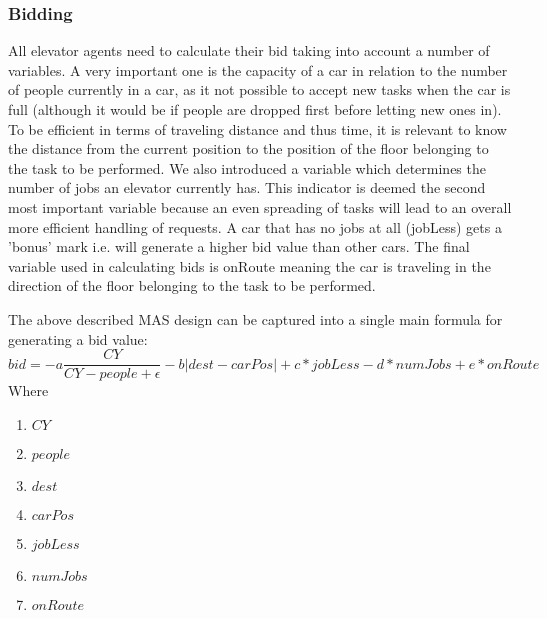 \documentclass[a4paper,11pt]{article}
\begin{document}
\subsubsection{Bidding}
All elevator agents need to calculate their bid taking into account a number of variables. A very important one is the capacity of a car in relation to the number of people currently in a car, as it not possible to accept new tasks when the car is full (although it would be if people are dropped first before letting new ones in). To be efficient in terms of traveling distance and thus time, it is relevant to know the distance from the current position to the position of the floor belonging to the task to be performed. We also introduced a variable which determines the number of jobs an elevator currently has. This indicator is deemed the second most important variable because an even spreading of tasks will lead to an overall more efficient handling of requests. A car that has no jobs at all (jobLess) gets a 'bonus' mark i.e. will generate a higher bid value than other cars. The final variable used in calculating bids is onRoute meaning the car is traveling in the direction of the floor belonging to the task to be performed. 

The above described MAS design can be captured into a single main formula for generating a bid value:
\newline
\[bid = -a\frac{CY}{CY-people+\epsilon} - b|dest - carPos| + c*jobLess - d*numJobs + e*onRoute\]
\newline\newline
Where
\begin{enumerate}
	\item[] $CY$
	\item[] $people$
	\item[] $dest$ 
	\item[] $carPos$  
	\item[] $jobLess$ 
	\item[] $numJobs$
	\item[] $onRoute$ 
\end{enumerate}
\end{document}
